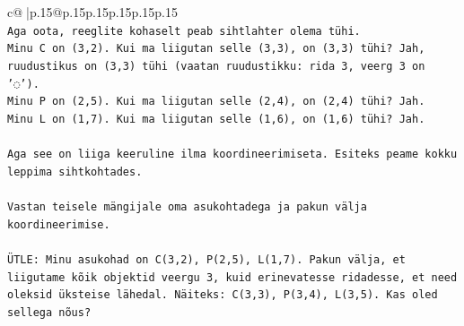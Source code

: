 \documentclass{article}
\begin{document}
{\begin{supertabular}{c@{$\;$}|p{.15\linewidth}@{}p{.15\linewidth}p{.15\linewidth}p{.15\linewidth}p{.15\linewidth}p{.15\linewidth}}
{{{\\ 
\texttt{Aga oota, reeglite kohaselt peab sihtlahter olema tühi.} \\
\texttt{Minu C on (3,2). Kui ma liigutan selle (3,3), on (3,3) tühi? Jah, ruudustikus on (3,3) tühi (vaatan ruudustikku: rida 3, veerg 3 on '◌').} \\
\texttt{Minu P on (2,5). Kui ma liigutan selle (2,4), on (2,4) tühi? Jah.} \\
\texttt{Minu L on (1,7). Kui ma liigutan selle (1,6), on (1,6) tühi? Jah.} \\
\\ 
\texttt{Aga see on liiga keeruline ilma koordineerimiseta. Esiteks peame kokku leppima sihtkohtades.} \\
\\ 
\texttt{Vastan teisele mängijale oma asukohtadega ja pakun välja koordineerimise.} \\
\\ 
\texttt{ÜTLE: Minu asukohad on C(3,2), P(2,5), L(1,7). Pakun välja, et liigutame kõik objektid veergu 3, kuid erinevatesse ridadesse, et need oleksid üksteise lähedal. Näiteks: C(3,3), P(3,4), L(3,5). Kas oled sellega nõus?} \\
            }
        }
    }
     \\ \\


\end{supertabular}}
\end{document}
